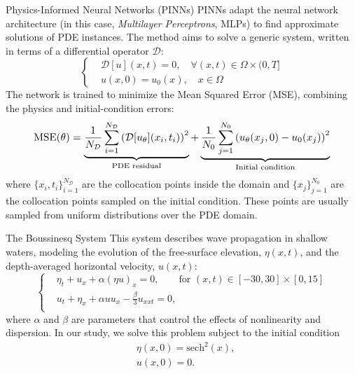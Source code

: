 \documentclass[final]{beamer}
\newlength{\colwidth}
\begin{document}
\begin{frame}[t]
\begin{columns}[t]
\begin{column}{\colwidth}
  \begin{block}{Physics-Informed Neural Networks (PINNs)}
    PINNs adapt the neural network architecture (in this case, \textit{Multilayer Perceptrons}, MLPs) to find approximate solutions of PDE instances. The method aims to solve a generic system, written in terms of a differential operator $\mathcal{D}$:
    \begin{equation*}
        \left\{
        \begin{aligned}
            & \mathcal{D}[u](x,t) = 0, \quad \forall (x,t) \in \Omega \times (0, T] \\
            & u(x,0) = u_0(x), \quad x \in \Omega
        \end{aligned}
        \right.
    \end{equation*}
    The network is trained to minimize the Mean Squared Error (MSE), combining the physics and initial-condition errors:
    \begin{equation*}
    \resizebox{0.9\columnwidth}{!}{ $
    \text{MSE}(\theta) = \underbrace{\frac{1}{N_{\mathcal{D}}} \sum_{i=1}^{N_{\mathcal{D}}} \left( \mathcal{D}[u_\theta](x_i, t_i) \right)^2}_{\text{PDE residual}} +
                       \underbrace{\frac{1}{N_{0}} \sum_{j=1}^{N_{0}} \left( u_\theta(x_j, 0) - u_0(x_j) \right)^2}_{\text{Initial condition}}
    $ }
    \end{equation*}
    where $\{x_i, t_i\}_{i=1}^{N_{\mathcal{D}}}$ are the collocation points inside the domain and $\{x_j\}_{j=1}^{N_0}$ are the collocation points sampled on the initial condition. These points are usually sampled from uniform distributions over the PDE domain.
  \end{block}
  \begin{block}{The Boussinesq System}
    This system describes wave propagation in shallow waters, modeling the evolution of the free-surface elevation, $\eta(x,t)$, and the depth-averaged horizontal velocity, $u(x,t)$: 
    \begin{equation*}
    \left\{
    \begin{aligned}
        & \eta_t + u_x + \alpha(\eta u)_x = 0, \qquad \text{for } (x,t) \in [-30, 30] \times [0, 15] \\
        & u_t + \eta_x + \alpha u u_x - \tfrac{\beta}{3} u_{xxt} = 0, \\
    \end{aligned}
    \right.
    \end{equation*}
    where $\alpha$ and $\beta$ are parameters that control the effects of nonlinearity and dispersion. In our study, we solve this problem subject to the initial condition
    \begin{equation*}
    \begin{aligned}
        & \eta(x, 0) = \text{sech}^2(x), \\
        & u(x, 0) = 0.
    \end{aligned}
    \end{equation*}


\end{block}
\end{column}
\end{columns}
\end{frame}
\end{document}
